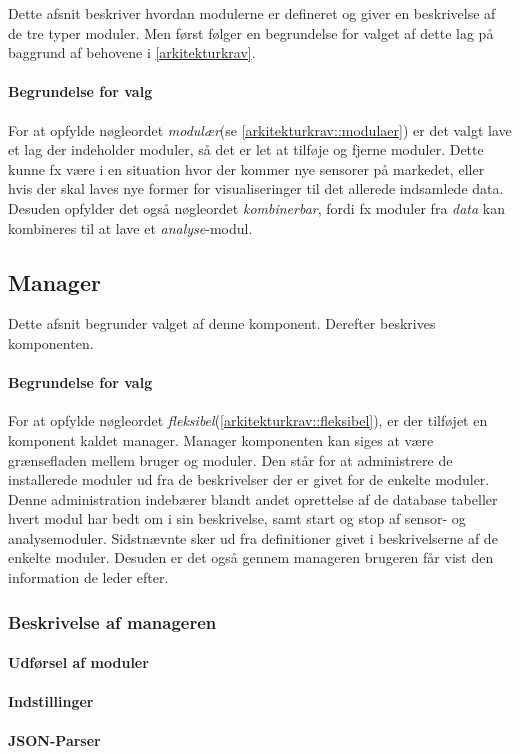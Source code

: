 Dette afsnit beskriver hvordan modulerne er defineret og giver en beskrivelse af de tre typer moduler.
Men først følger en begrundelse for valget af dette lag på baggrund af behovene i \cref{arkitekturkrav}.

\paragraph{Begrundelse for valg}
For at opfylde nøgleordet \textit{modulær}(se \cref{arkitekturkrav::modulaer}) er det valgt lave et lag der indeholder moduler, så det er let at tilføje og fjerne moduler.
Dette kunne fx være i en situation hvor der kommer nye sensorer på markedet, eller hvis der skal laves nye former for visualiseringer til det allerede indsamlede data.
Desuden opfylder det også nøgleordet \textit{kombinerbar}, fordi fx moduler fra \textit{data} kan kombineres til at lave et \textit{analyse}-modul.



\subsection{Manager}\label{subsec:arkitektur-Manager}
Dette afsnit begrunder valget af denne komponent.
Derefter beskrives komponenten.

\paragraph{Begrundelse for valg}
For at opfylde nøgleordet \textit{fleksibel}(\cref{arkitekturkrav::fleksibel}), er der tilføjet en komponent kaldet manager.
Manager komponenten kan siges at være grænsefladen mellem bruger og moduler.
Den står for at administrere de installerede moduler ud fra de beskrivelser der er givet for de enkelte moduler.
Denne administration indebærer blandt andet oprettelse af de database tabeller hvert modul har bedt om i sin beskrivelse, samt start og stop af sensor- og analysemoduler.
Sidstnævnte sker ud fra definitioner givet i beskrivelserne af de enkelte moduler.
Desuden er det også gennem manageren brugeren får vist den information de leder efter.

\subsubsection{Beskrivelse af manageren}

\paragraph{Udførsel af moduler}

\paragraph{Indstillinger}\label{sec:settings}

\paragraph{JSON-Parser}\label{subsub:JSONparser}



